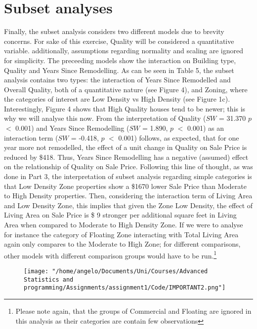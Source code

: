 \documentclass[a4paper]{article}
\begin{document}
\section{Subset analyses}
Finally, the subset analysis considers two different models due to brevity concerns. For sake of this exercise, Quality will be considered a quantitative variable. additionally, assumptions regarding normality and scaling are ignored for simplicity. The preceeding models show the interaction on Building type, Quality and Years Since Remodelling. 
As can be seen in Table 5, the subset analysis contains two types: the interaction of Years Since Remodelled and Overall Quality, both of a quantitative nature (see Figure 4), and Zoning, where the categories of interest are Low Density vs High Density (see Figure 1c). Interestingly, Figure 4 shows that High Quality houses tend to be newer; this is why we will analyse this now.
From the interpretation of Quality ($SW$ = 31.370  $p$ $<$ 0.001) and Years Since Remodelling ($SW$ = 1.890,  $p$ $<$ 0.001) as an interaction term ($SW$ = -0.418,  $p$ $<$ 0.001) follows, as expected, that for one year more not remodelled, the effect of a unit change in Quality on Sale Price is reduced by \$418. Thus, Years Since Remodelling has a negative (assumed) effect on the relationship of Quality on Sale Price. 
Following this line of thought, as was done in Part 3, the interpretation of subset analysis regarding simple categories is that Low Density Zone properties show a \$1670 lower Sale Price than Moderate to High Density properties. Then, considering the interaction term of Living Area and Low Density Zone, this implies that given the Zone Low Density, the effect of Living Area on Sale Price is \$ 9 stronger per additional square feet in Living Area when compared to Moderate to High Density Zone. If we were to analyse for instance the category of Floating Zone interacting with Total Living Area again only compares to the Moderate to High Zone; for different comparisons, other models with different comparison groups would have to be run.\footnote{Please note again, that the groups of Commercial and Floating are ignored in this analysis as their categories are contain few observations}

\begin{figure}[htp]
\begin{adjustwidth}{-2.5cm}{-2.5cm}
		\centering
         \texttt{[image: "/home/angelo/Documents/Uni/Courses/Advanced Statistics and programming/Assignments/assignment1/Code/IMPORTANT2.png"]}
         \small
\end{adjustwidth}
\end{figure}
\end{document}
